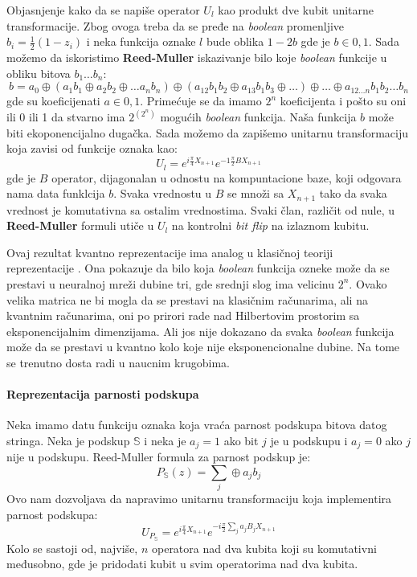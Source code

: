\documentclass[12pt, letterpaper, oneside]{article}
\begin{document}
Objasnjenje kako da se napiše operator $U_l$ kao produkt dve kubit unitarne transformacije. Zbog ovoga treba da se pređe na \textit{boolean} promenljive $b_i=\frac{1}{2}(1-z_i)$ i 
neka funkcija oznake $l$ bude oblika $1-2b$ gde je $b \in {0,1}$. Sada možemo da iskoristimo \textbf{Reed-Muller} iskazivanje bilo koje \textit{boolean} funkcije u obliku bitova $b_1 \dots b_n$:
\[
    b = a_0 \oplus (a_1b_1 \oplus a_2b_2 \oplus \dots a_nb_n) \oplus (a_{12}b_1b_2 \oplus a_{13}b_1b_3 \oplus \dots) \oplus \dots \oplus a_{12 \dots n}b_1b_2 \dots b_n
\]
gde su koeficijenati $a \in {0,1}$. Primećuje se da imamo $2^n$ koeficijenta i pošto su oni ili 0 ili 1 da stvarno ima $2^{(2^n)}$ mogućih \textit{boolean} funkcija.
Naša funkcija $b$ može biti ekoponencijalno dugačka. Sada možemo da zapišemo unitarnu transformaciju koja zavisi od funkcije oznaka kao:
\[
    U_l = e^{i\frac{\pi}{4}X_{n+1}}e^{-1\frac{\pi}{2}BX_{n+1}}
\]
gde je $B$ operator, dijagonalan u odnostu na kompuntacione baze, koji odgovara nama data funklcija $b$. 
Svaka vrednostu u $B$ se množi sa $X_{n+1}$ tako da svaka vrednost je komutativna sa ostalim vrednostima. 
Svaki član, različit od nule, u \textbf{Reed-Muller} formuli utiče u $U_l$ na kontrolni \textit{bit flip} na izlaznom kubitu.

Ovaj rezultat kvantno reprezentacije ima analog u klasičnoj teoriji \\
reprezentacije \cite{Cybenko1989ApproximationBS}.
Ona pokazuje da bilo koja \textit{boolean} funkcija ozneke može da se prestavi u neuralnoj mreži dubine tri, gde srednji slog 
ima velicinu $2^n$. Ovako velika matrica ne bi mogla da se prestavi na klasičnim računarima, ali na kvantnim računarima, oni po prirori rade
nad Hilbertovim prostorim sa eksponencijalnim dimenzijama. Ali jos nije dokazano da svaka \textit{boolean} funkcija može da se prestavi u
kvantno kolo koje nije eksponencionalne dubine. Na tome se trenutno dosta radi u naucnim krugobima.

\paragraph*{Reprezentacija parnosti podskupa}
Neka imamo datu funkciju oznaka koja vraća parnost podskupa bitova datog stringa. Neka je podskup $\mathbb{S}$
i neka je $a_j=1$ ako bit $j$ je u podskupu i $a_j=0$ ako $j$ nije u podskupu. Reed-Muller formula za parnost podskup je:
\[
    P_{\mathbb{S}}(z) = \sum_j \oplus a_jb_j
\]
Ovo nam dozvoljava da napravimo unitarnu transformaciju koja implementira parnost podskupa:
\[
    U_{P_{\mathbb{S}}} = e^{i\frac{\pi}{4}X_{n+1}}e^{-i\frac{\pi}{2}\sum_j a_jB_jX_{n+1}}
\]
Kolo se sastoji od, najviše, $n$ operatora nad dva kubita koji su komutativni međusobno, gde je pridodati kubit u svim operatorima nad dva kubita.
\end{document}
